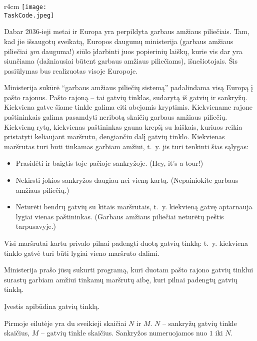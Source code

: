 \documentclass{boi2014-lt}
\renewcommand{\TaskCode}{postmen}
\begin{document}
    \begin{wrapfigure}[8]{r}{4cm}
        \vspace{-18pt}
		\texttt{[image: \\TaskCode.jpeg]}
	\end{wrapfigure}
    Dabar 2036-ieji metai ir Europa yra perpildyta garbaus amžiaus piliečiais.
    Tam, kad jie išsaugotų sveikatą, Europos daugumų ministerija (garbaus amžiaus
    piliečiai \emph{yra} dauguma!) siūlo įdarbinti juos popierinių laiškų,
    kurie vis dar yra siunčiama (dažniausiai būtent garbaus amžiaus piliečiams),
    išnešiotojais. Šis pasiūlymas bus realizuotas visoje Europoje.

    Ministerija sukūrė ``garbaus amžiaus piliečių sistemą'' padalindama visą
    Europą į pašto rajonus. Pašto rajoną -- tai gatvių tinklas, sudarytą iš
    gatvių ir sankryžų. Kiekviena gatve šiame tinkle galima eiti abejomis
    kryptimis. Kiekviename rajone paštininkais galima pasamdyti neribotą skaičių
    garbaus amžiaus piliečių. Kiekvieną rytą, kiekvienas paštininkas gauna krepšį
    su laiškais, kuriuos reikia pristatyti keliaujant maršrutu, dengiančiu dalį
    gatvių tinklo. Kiekvienas maršrutas turi būti tinkamas garbiam amžiui, t.~y.
    jis turi tenkinti šias sąlygas:
    \begin{itemize}
        \item Prasidėti ir baigtis toje pačioje sankryžoje. (Hey, it’s a tour!)
        \item Nekirsti jokios sankryžos daugiau nei vieną kartą. (Nepainiokite
            garbaus amžiaus piliečių.)
        \item Neturėti bendrų gatvių su kitais maršrutais, t.~y. kiekvieną gatvę
            aptarnauja lygiai vienas paštininkas. (Garbaus amžiaus piliečiai
            neturėtų peštis tarpusavyje.)
    \end{itemize}

    Visi maršrutai kartu privalo pilnai padengti duotą gatvių tinklą: t.~y.
    kiekviena tinklo gatvė turi būti lygiai vieno maršruto dalimi.

    \Task
    Ministerija prašo jūsų sukurti programą, kuri duotam pašto rajono gatvių
    tinklui surastų garbiam amžiui tinkamų maršrutų aibę, kuri pilnai padengtų
    gatvių tinklą.

    \Input
    Įvestis apibūdina gatvių tinklą.
    
    Pirmoje eilutėje yra du sveikieji skaičiai $N$ ir $M$. $N$ -- sankryžų gatvių
    tinkle skaičius, $M$ -- gatvių tinkle skaičius. Sankryžos numeruojamos nuo
    $1$ iki $N$.
\end{document}
